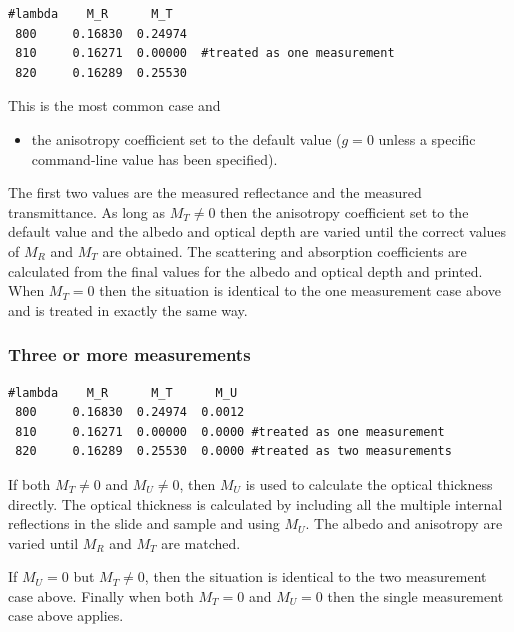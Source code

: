 \documentclass{article}
\begin{document}
\begin{center}
\begin{minipage}{6cm}
\scriptsize
\begin{verbatim}
#lambda	   M_R      M_T
 800     0.16830  0.24974
 810     0.16271  0.00000  #treated as one measurement
 820     0.16289  0.25530
\end{verbatim}
\end{minipage}
\end{center}
This is the most common case and
\begin{itemize}
\item 
the anisotropy
coefficient set to the default value ($g=0$ unless a specific command-line 
value has been specified).  
\end{itemize}
The first two values are the measured
reflectance and the measured transmittance. As long as
$M_T \ne 0$ then the anisotropy coefficient set to the default value and
the albedo and optical depth are varied until the correct values of $M_R$ and 
$M_T$ are obtained.  The scattering and absorption coefficients are calculated
from the final values for the albedo and optical depth and printed. When $M_T=0$
then the situation is identical to the one measurement case above and is treated
in exactly the same way.

\subsubsection{Three or more measurements}

\begin{center}
\begin{minipage}{8cm}
\scriptsize
\begin{verbatim}
#lambda	   M_R      M_T      M_U
 800     0.16830  0.24974  0.0012
 810     0.16271  0.00000  0.0000 #treated as one measurement
 820     0.16289  0.25530  0.0000 #treated as two measurements
\end{verbatim}
\end{minipage}
\end{center}
If both $M_T\ne0$ and $M_U\ne0$, then $M_U$ is used to calculate
the optical thickness directly.  The optical thickness is calculated by including
all the multiple internal reflections in the slide and sample and
using $M_U$.  
The albedo and anisotropy are varied until $M_R$ and $M_T$ are
matched. 

If $M_U=0$ but $M_T\ne0$, then the situation is identical to the two measurement
case above.  Finally when both $M_T=0$ and $M_U=0$ then the single measurement 
case above applies.
\end{document}
